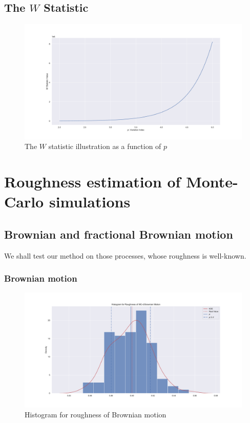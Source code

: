     \subsection{The $W$ Statistic}
        \begin{figure}[htbp]
            \centering
            \includegraphics[width=\linewidth]{fig/W Stat Illustration.pdf}
            \caption{The $W$ statistic illustration as a function of $p$}
        \end{figure}

\section{Roughness estimation of Monte-Carlo simulations}

    \subsection{Brownian and fractional Brownian motion}
        We shall test our method on those processes, whose roughness is well-known.
        \subsubsection{Brownian motion}
            \begin{figure}[htbp]
                \centering
                \includegraphics[width=\linewidth]{fig/Histogram for Roughness of MC-d Brownian Motion.pdf}
                \caption{Histogram for roughness of Brownian motion}
            \end{figure}

